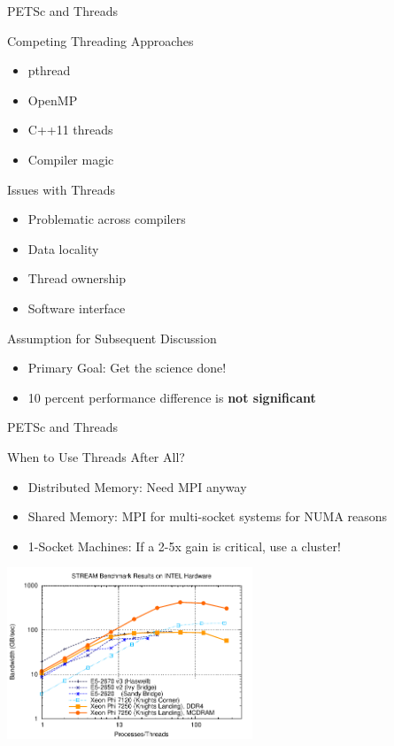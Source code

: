 
\begin{frame}[fragile]{PETSc and Threads}

 \begin{block}{Competing Threading Approaches}
  \begin{itemize}
   \item pthread
   \item OpenMP
   \item C++11 threads
   \item Compiler magic
  \end{itemize}
 \end{block}

 \begin{block}{Issues with Threads}
  \begin{itemize}
   \item Problematic across compilers
   \item Data locality
   \item Thread ownership
   \item Software interface
  \end{itemize}
 \end{block}

  \begin{block}{Assumption for Subsequent Discussion}
  \begin{itemize}
   \item Primary Goal: Get the science done!
   \item 10 percent performance difference is \textbf{not significant}
  \end{itemize}
 \end{block}

\end{frame}


\begin{frame}[fragile]{PETSc and Threads}
  \begin{block}{When to Use Threads After All?}
    \begin{itemize}
     \item Distributed Memory: Need MPI anyway
     \item Shared Memory: MPI for multi-socket systems for NUMA reasons
     \item 1-Socket Machines: If a 2-5x gain is critical, use a cluster!
    \end{itemize}
  \end{block}

  \begin{center}
    \includegraphics[width=0.55\textwidth]{figures/stream}
  \end{center}
  
\end{frame}


